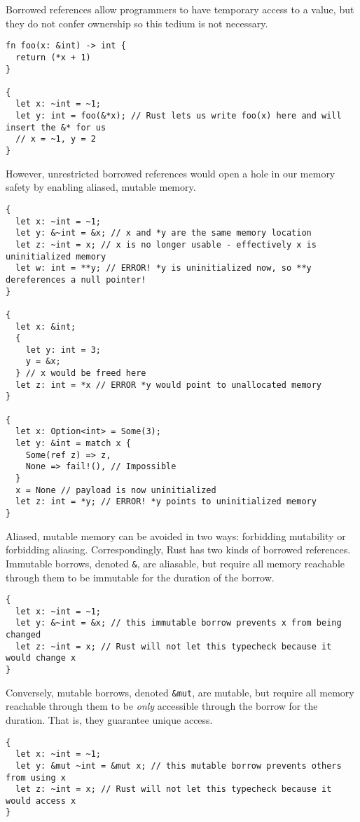 Borrowed references allow programmers to have temporary access to a value,
but they do not confer ownership so this tedium is not necessary.
\begin{verbatim}
fn foo(x: &int) -> int {
  return (*x + 1)
}

{
  let x: ~int = ~1;
  let y: int = foo(&*x); // Rust lets us write foo(x) here and will insert the &* for us
  // x = ~1, y = 2
}
\end{verbatim}

However, unrestricted borrowed references would open a hole in our memory safety
by enabling aliased, mutable memory.
\begin{verbatim}
{
  let x: ~int = ~1;
  let y: &~int = &x; // x and *y are the same memory location
  let z: ~int = x; // x is no longer usable - effectively x is uninitialized memory
  let w: int = **y; // ERROR! *y is uninitialized now, so **y dereferences a null pointer!
}

{
  let x: &int;
  {
    let y: int = 3;
    y = &x;
  } // x would be freed here
  let z: int = *x // ERROR *y would point to unallocated memory
}

{
  let x: Option<int> = Some(3);
  let y: &int = match x {
    Some(ref z) => z,
    None => fail!(), // Impossible
  }
  x = None // payload is now uninitialized
  let z: int = *y; // ERROR! *y points to uninitialized memory
}
\end{verbatim}

Aliased, mutable memory can be avoided in two ways: forbidding mutability or forbidding aliasing.
Correspondingly, Rust has two kinds of borrowed references.
Immutable borrows, denoted \texttt{\&}, are aliasable,
but require all memory reachable through them to be immutable for the duration of the borrow.
\begin{verbatim}
{
  let x: ~int = ~1;
  let y: &~int = &x; // this immutable borrow prevents x from being changed
  let z: ~int = x; // Rust will not let this typecheck because it would change x 
}
\end{verbatim}

Conversely, mutable borrows, denoted \texttt{\&mut}, are mutable,
but require all memory reachable through them to be \emph{only} accessible through the borrow
for the duration. That is, they guarantee unique access.
\begin{verbatim}
{
  let x: ~int = ~1;
  let y: &mut ~int = &mut x; // this mutable borrow prevents others from using x
  let z: ~int = x; // Rust will not let this typecheck because it would access x
}
\end{verbatim}

